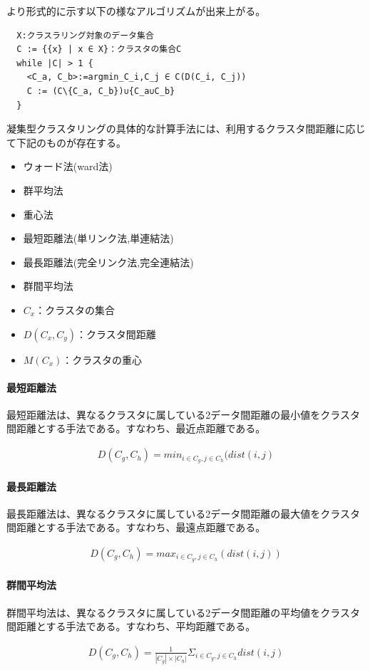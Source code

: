 \documentclass[dvipdfmx]{jsarticle}
\begin{document}
より形式的に示す以下の様なアルゴリズムが出来上がる。
\begin{verbatim}
  X:クラスラリング対象のデータ集合
  C := {{x} | x ∈ X}：クラスタの集合C
  while |C| > 1 {
    <C_a, C_b>:=argmin_C_i,C_j ∈ C(D(C_i, C_j))
    C := (C\{C_a, C_b})∪{C_a∪C_b}
  }
\end{verbatim}
凝集型クラスタリングの具体的な計算手法には、利用するクラスタ間距離に応じて下記のものが存在する。
\begin{itemize}
  \item ウォード法(ward法)
  \item 群平均法
  \item 重心法
  \item 最短距離法(単リンク法,単連結法)
  \item 最長距離法(完全リンク法,完全連結法)
  \item 群間平均法
\end{itemize}
\begin{itemize}
  \item $C_{x}$：クラスタの集合
  \item $D(C_{x}, C_{y})$：クラスタ間距離
  \item $M(C_{x})$：クラスタの重心
\end{itemize}
\paragraph{最短距離法}
最短距離法は、異なるクラスタに属している2データ間距離の最小値をクラスタ間距離とする手法である。すなわち、最近点距離である。
\begin{center}
\begin{eqnarray*}
    D(C_{g}, C_{h}) = min_{i \in C_{g}, j \in C_{h}}(dist(i, j)
\end{eqnarray*}
\end{center}
\paragraph{最長距離法}
最長距離法は、異なるクラスタに属している2データ間距離の最大値をクラスタ間距離とする手法である。すなわち、最遠点距離である。
\begin{center}
  \begin{eqnarray*}
    D(C_{g}, C_{h}) = max_{i \in C_{g}, j \in C_{h}}(dist(i, j))
  \end{eqnarray*}
\end{center}
\paragraph{群間平均法}
群間平均法は、異なるクラスタに属している2データ間距離の平均値をクラスタ間距離とする手法である。すなわち、平均距離である。
\begin{center}
  \begin{eqnarray*}
    D(C_{g}, C_{h}) = \frac{1}{|C_{g}|\times |C_{h}|}\Sigma_{i \in C_{g}, j \in C_{h}}dist(i,j)
  \end{eqnarray*}
\end{center}
\end{document}
